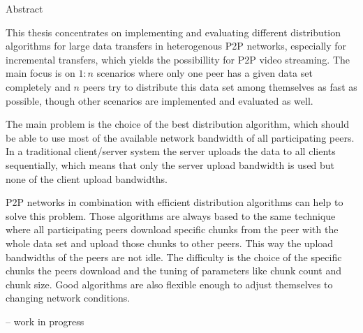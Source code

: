 
\begin{center} 
\huge Abstract
\end{center}


This thesis concentrates on implementing and evaluating different distribution algorithms for large data transfers in heterogenous P2P networks, especially for incremental transfers, which yields the possibillity for P2P video streaming. The main focus is on $1:n$ scenarios where only one peer has a given data set completely and $n$ peers try to distribute this data set among themselves as fast as possible, though other scenarios are implemented and evaluated as well.

The main problem is the choice of the best distribution algorithm, which should be able to use most of the available network bandwidth of all participating peers. In a traditional client/server system the server uploads the data to all clients sequentially, which means that only the server upload bandwidth is used but none of the client upload bandwidths.

P2P networks in combination with efficient distribution algorithms can help to solve this problem. Those algorithms are always based to the same technique where all participating peers download specific chunks from the peer with the whole data set and upload those chunks to other peers. This way the upload bandwidths of the peers are not idle. The difficulty is the choice of the specific chunks the peers download and the tuning of parameters like chunk count and chunk size. Good algorithms are also flexible enough to adjust themselves to changing network conditions.

-- work in progress